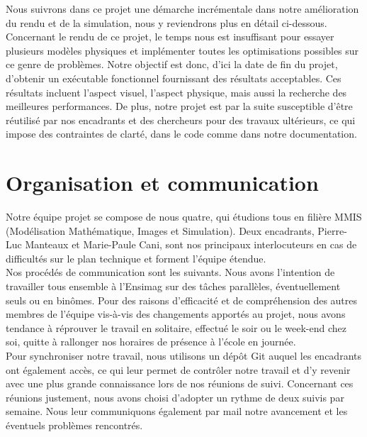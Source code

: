 \documentclass[12pt]{article}
\begin{document}
Nous suivrons dans ce projet une démarche incrémentale dans notre amélioration du rendu et de la simulation, nous y reviendrons plus en détail ci-dessous. \\

Concernant le rendu de ce projet, le temps nous est insuffisant pour essayer plusieurs modèles physiques et implémenter toutes les optimisations possibles sur ce genre de problèmes. Notre objectif est donc, d'ici la date de fin du projet, d'obtenir un exécutable fonctionnel fournissant des résultats acceptables. Ces résultats incluent l'aspect visuel, l'aspect physique, mais aussi la recherche des meilleures performances. De plus, notre projet est par la suite susceptible d'être réutilisé par nos encadrants et des chercheurs pour des travaux ultérieurs, ce qui impose des contraintes de clarté, dans le code comme dans notre documentation. 

\section{Organisation et communication}

Notre équipe projet se compose de nous quatre, qui étudions tous en filière MMIS (Modélisation Mathématique, Images et Simulation). Deux encadrants, Pierre-Luc Manteaux et Marie-Paule Cani, sont nos principaux interlocuteurs en cas de difficultés sur le plan technique et forment l'équipe étendue. \\

Nos procédés de communication sont les suivants. Nous avons l'intention de travailler tous ensemble à l'Ensimag sur des tâches parallèles, éventuellement seuls ou en binômes. Pour des raisons d'efficacité et de compréhension des autres membres de l'équipe vis-à-vis des changements apportés au projet, nous avons tendance à réprouver le travail en solitaire, effectué le soir ou le week-end chez soi, quitte à rallonger nos horaires de présence à l'école en journée. \\

Pour synchroniser notre travail, nous utilisons un dépôt Git auquel les encadrants ont également accès, ce qui leur permet de contrôler notre travail et d'y revenir avec une plus grande connaissance lors de nos réunions de suivi. Concernant ces réunions justement, nous avons choisi d'adopter un rythme de deux suivis par semaine. Nous leur communiquons également par mail notre avancement et les éventuels problèmes rencontrés. \\
\end{document}
